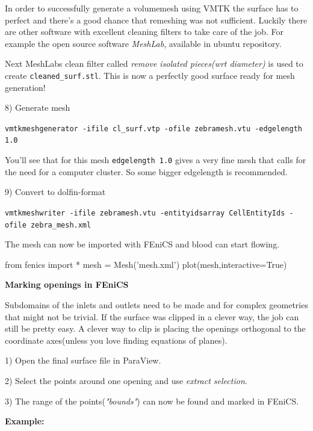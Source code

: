\documentclass[epsfig,11pt]{article}
\begin{document}
In order to successfully generate a volumemesh using VMTK the surface has to perfect and there's a good chance that remeshing was not sufficient. Luckily there are other software with excellent cleaning filters to take care of the job. For example the open source software \emph{MeshLab}, available in ubuntu repository. 

Next MeshLabs clean filter called \emph{remove isolated pieces(wrt diameter) } is used to create \texttt{cleaned\_surf.stl}. This is now a perfectly good surface ready for mesh generation!

8) Generate mesh
\begin{framed}       
    \texttt{vmtkmeshgenerator -ifile cl\_surf.vtp -ofile zebramesh.vtu -edgelength 1.0}
\end{framed}

You'll see that for this mesh \texttt{edgelength 1.0} gives a very fine mesh that calls for the need for a computer cluster. So some bigger edgelength is recommended.

9) Convert to dolfin-format
\begin{framed}       
    \texttt{vmtkmeshwriter -ifile zebramesh.vtu -entityidsarray CellEntityIds -ofile zebra\_mesh.xml}
\end{framed}

The mesh can now be imported with FEniCS and blood can start flowing. 

\begin{python}
from fenics import *
mesh = Mesh('mesh.xml')
plot(mesh,interactive=True)
\end{python}

\newpage

\textbf{Marking openings in FEniCS}

Subdomains of the inlets and outlets need to be made and for complex geometries that might not be trivial. If the surface was clipped in a clever way, the job can still be pretty easy. A clever way to clip is placing the openings orthogonal to the coordinate axes(unless you love finding equations of planes).

1) Open the final surface file in ParaView.

2) Select the points around one opening and use \emph{extract selection}.

3) The range of the points(\emph{"bounds"}) can now be found and marked in FEniCS.

\textbf{Example:}
\end{document}
